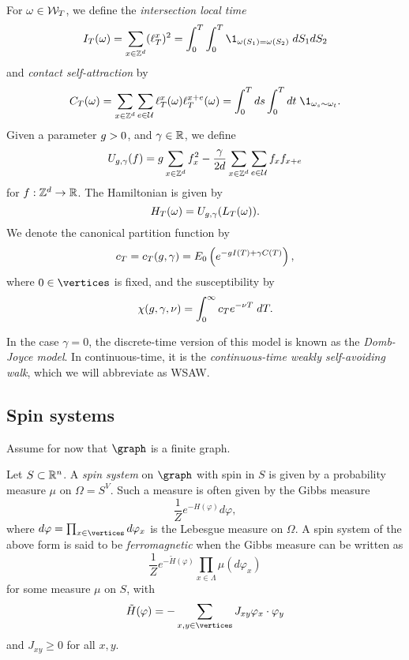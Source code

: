 For $\omega \in \mathcal{W}_T$, we define the \emph{intersection local time}
\begin{equation}
\label{e:ITdef}
I_T(\omega) = \sum_{x\in\Zd} (\lt^x_T)^2 = \int_0^T \int_0^T \1_{\omega(S_1)=\omega(S_2)} \; dS_1 dS_2
\end{equation}
and \emph{contact self-attraction} by
\begin{equation}
\label{e:CTdef}
C_T(\omega) =
  \sum_{x \in \Z^d}\sum_{e\in\Ucal} \lt_T^x(\omega) \lt_T^{x+e}(\omega)
  = \int_0^T ds \int_0^T dt \; \1_{\omega_{s} \sim \omega_{t}}.
\end{equation}
Given a parameter $g > 0$,
and $\gamma \in {\mathbb R}$, we define
\begin{equation}
\label{e:Udef-neg}
U_{g,\gamma}(f)
=
g \sum_{x\in{ {{\mathbb Z}}^d }} f_x^2
- \frac{\gamma}{2d}
\sum_{x\in{ {{\mathbb Z}}^d }} \sum_{e\in\mathcal{U}} f_x f_{x+e}
\end{equation}
for $f : { {{\mathbb Z}}^d } \rightarrow {\mathbb R}$.
The Hamiltonian is given by
\begin{equation}
H_T(\omega) = U_{g,\gamma}(L_T(\omega)).
\end{equation}
We denote the canonical partition function by
\begin{equation}
c_T = c_T(g, \gamma) = E_0 \left( e^{-g I(T) + \gamma C(T)} \right),
\end{equation}
where $0 \in \vertices$ is fixed,
and the susceptibility by
\begin{equation}
\chi(g, \gamma, \nu) = \int_0^\infty c_T e^{-\nu T} \; dT.
\end{equation}

In the case $\gamma = 0$, the discrete-time version of this model is known as
the \emph{Domb-Joyce model}. In continuous-time, it is the \emph{continuous-time
weakly self-avoiding walk}, which we will abbreviate as WSAW.


\subsection{Spin systems}

Assume for now that $\graph$ is a finite graph.

Let $S \subset {\mathbb R}^n$. A \emph{spin system} on $\graph$ with spin in $S$ is given
by a probability measure $\mu$ on $\Omega = S^V$. Such a measure is often given by the
Gibbs measure
\begin{equation}
\frac{1}{Z} e^{-H(\varphi)} d\varphi,
\end{equation}
where $d\varphi = \prod_{x\in\vertices} d\varphi_x$ is the Lebesgue measure on
$\Omega$. A spin system of the above form is said to be \emph{ferromagnetic} when
the Gibbs measure can be written as
\begin{equation}
\frac{1}{Z} e^{-\tilde H(\varphi)} \prod_{x\in\Lambda} \mu(d\varphi_x)
\end{equation}
for some measure $\mu$ on $S$, with
\begin{equation}
\tilde H(\varphi) = -\sum_{x, y \in \vertices} J_{xy} \varphi_x \cdot \varphi_y
\end{equation}
and $J_{xy} \ge 0$ for all $x, y$.

